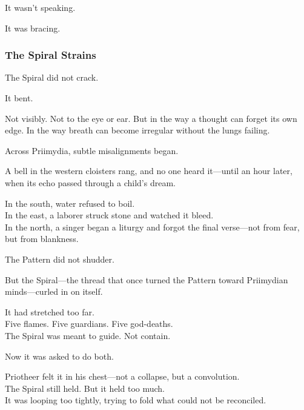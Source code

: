\documentclass[12pt]{article}
\begin{document}
\vspace{0.5em}
It wasn’t speaking.

\vspace{0.5em}
It was bracing.

\dotfill

\subsubsection*{The Spiral Strains}

The Spiral did not crack.

\vspace{0.5em}
It bent.

\vspace{0.5em}
Not visibly. Not to the eye or ear. But in the way a thought can forget its own edge. In the way breath can become irregular without the lungs failing.

\vspace{0.5em}
Across Priimydia, subtle misalignments began.

\vspace{0.5em}
A bell in the western cloisters rang, and no one heard it---until an hour later, when its echo passed through a child’s dream.

\vspace{0.5em}
In the south, water refused to boil.\\
In the east, a laborer struck stone and watched it bleed.\\
In the north, a singer began a liturgy and forgot the final verse---not from fear, but from blankness.

\vspace{0.5em}
The Pattern did not shudder.

\vspace{0.5em}
But the Spiral---the thread that once turned the Pattern toward Priimydian minds---curled in on itself.

\vspace{0.5em}
It had stretched too far.\\
Five flames. Five guardians. Five god-deaths.\\
The Spiral was meant to guide. Not contain.

\vspace{0.5em}
Now it was asked to do both.

\vspace{0.5em}
Priotheer felt it in his chest---not a collapse, but a convolution.\\
The Spiral still held. But it held too much.\\
It was looping too tightly, trying to fold what could not be reconciled.
\end{document}
